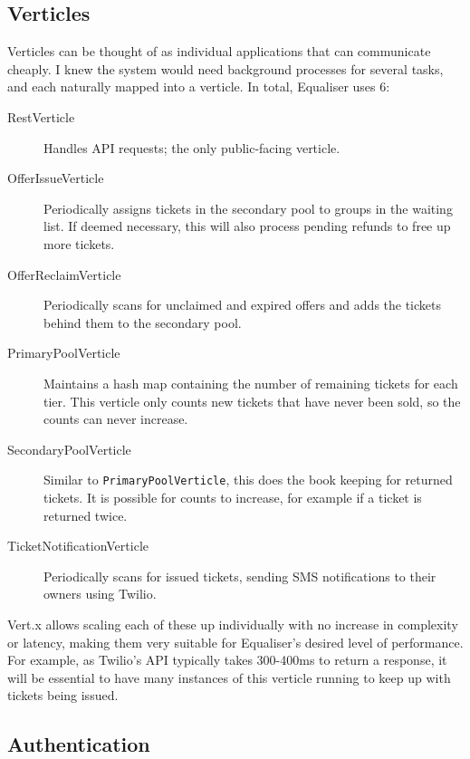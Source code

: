 \documentclass[12pt,a4paper]{bhamdissertation}
\newcommand{\code}[1]{\texttt{#1}}
\begin{document}
\subsection{Verticles}

Verticles can be thought of as individual applications that can communicate cheaply. I knew the system would need background processes for several tasks, and each naturally mapped into a verticle. In total, Equaliser uses 6:

\begin{description}
    \item[RestVerticle] Handles API requests; the only public-facing verticle. 
    \item[OfferIssueVerticle] Periodically assigns tickets in the secondary pool to groups in the waiting list. If deemed necessary, this will also process pending refunds to free up more tickets.
    \item[OfferReclaimVerticle] Periodically scans for unclaimed and expired offers and adds the tickets behind them to the secondary pool.
    \item[PrimaryPoolVerticle] Maintains a hash map containing the number of remaining tickets for each tier. This verticle only counts new tickets that have never been sold, so the counts can never increase.
    \item[SecondaryPoolVerticle] Similar to \code{PrimaryPoolVerticle}, this does the book keeping for returned tickets. It is possible for counts to increase, for example if a ticket is returned twice.
    \item[TicketNotificationVerticle] Periodically scans for issued tickets, sending SMS notifications to their owners using Twilio.
\end{description}

Vert.x allows scaling each of these up individually with no increase in complexity or latency, making them very suitable for Equaliser's desired level of performance. For example, as Twilio's API typically takes 300-400ms to return a response, it will be essential to have many instances of this verticle running to keep up with tickets being issued.

\subsection{Authentication} \label{tech_design_api_authentication}
\end{document}
